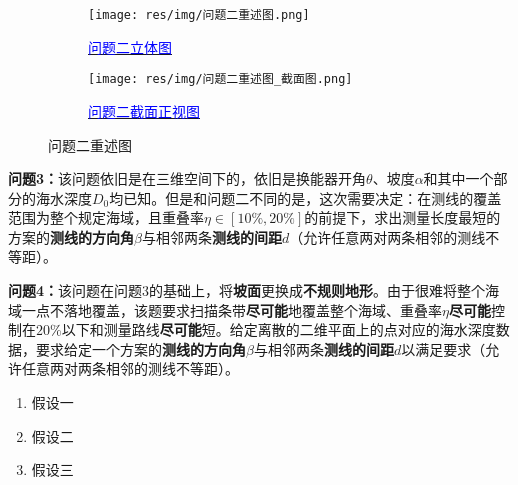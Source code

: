 \begin{figure}[htbp]
    \centering
    \begin{subfigure}[b]{0.45\textwidth}
      \centering
      \texttt{[image: res/img/问题二重述图.png]}
      \caption{\href{https://www.geogebra.org/m/pwzyn5ba}{\textcolor{blue}{问题二立体图}}}
      \label{fig:问题二立体图}
    \end{subfigure}
    \hfill
    \begin{subfigure}[b]{0.45\textwidth}
      \centering
      \texttt{[image: res/img/问题二重述图\_截面图.png]}
      \caption{\href{https://www.geogebra.org/m/g2rwmqvx}{\textcolor{blue}{问题二截面正视图}}}
      \label{fig:问题二截面正视图}
    \end{subfigure}
    \caption{问题二重述图}
    \label{fig:问题二重述图}
\end{figure}

\textbf{问题3：}该问题依旧是在三维空间下的，依旧是换能器开角$\theta$、坡度$\alpha$和其中一个部分的海水深度$D_0$均已知。但是和问题二不同的是，这次需要决定：在测线的覆盖范围为整个规定海域，且重叠率$\eta \in [10\%, 20\%]$的前提下，求出测量长度最短的方案的\textbf{测线的方向角}$\beta$与相邻两条\textbf{测线的间距}$d$（允许任意两对两条相邻的测线不等距）。

\textbf{问题4：}该问题在问题3的基础上，将\textbf{坡面}更换成\textbf{不规则地形}。由于很难将整个海域一点不落地覆盖，该题要求扫描条带\textbf{尽可能}地覆盖整个海域、重叠率$\eta$\textbf{尽可能}控制在$20\%$以下和测量路线\textbf{尽可能}短。给定离散的二维平面上的点对应的海水深度数据，要求给定一个方案的\textbf{测线的方向角}$\beta$与相邻两条\textbf{测线的间距}$d$以满足要求（允许任意两对两条相邻的测线不等距）。







\begin{enumerate}
    \item 假设一
    \item 假设二
    \item 假设三
\end{enumerate}

